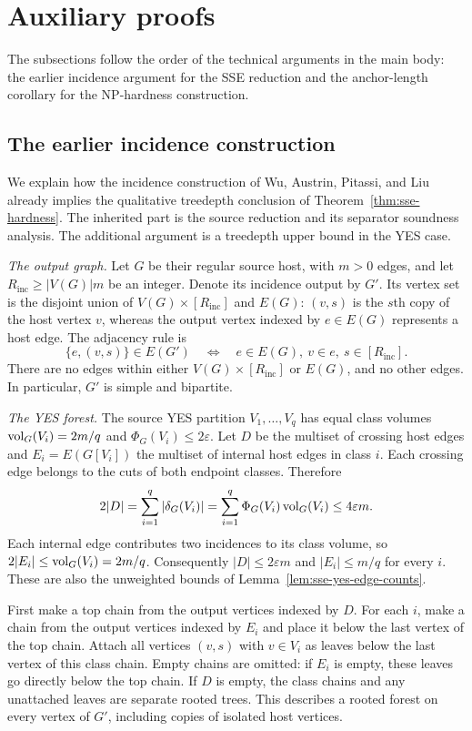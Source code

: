 ﻿\section{Auxiliary proofs}
\label{sec:auxiliary-proofs}

The subsections follow the order of the technical arguments in the
main body: the earlier incidence argument for the \textup{SSE} reduction
and the anchor-length corollary for the \textup{NP}-hardness construction.

\subsection{The earlier incidence construction}
\label{app:incidence-proof}

We explain how the incidence construction of Wu, Austrin, Pitassi, and
Liu~\cite[Sections~4.3 and~5]{APW} already implies the qualitative
treedepth conclusion of Theorem~\ref{thm:sse-hardness}. The inherited
part is the source reduction and its separator soundness analysis.
The additional argument is a treedepth upper bound in the YES case.

\emph{The output graph.}
Let $G$ be their regular source host, with $m>0$ edges, and let
$R_{\mathrm{inc}}\geq |V(G)|m$ be an integer. Denote its incidence output by
$G'$. Its vertex set is the disjoint union of $V(G)\times[R_{\mathrm{inc}}]$ and
$E(G)$: $(v,s)$ is the $s$th copy of the host vertex $v$, whereas
the output vertex indexed by $e\in E(G)$ represents a host edge.
The adjacency rule is
\[
 \{e,(v,s)\}\in E(G')
 \quad\Longleftrightarrow\quad
 e\in E(G),\ v\in e,\ s\in[R_{\mathrm{inc}}].
\]
There are no edges within either $V(G)\times[R_{\mathrm{inc}}]$ or $E(G)$, and
no other edges. In particular, $G'$ is simple and bipartite.

\emph{The YES forest.}
The source YES partition $V_1,\ldots,V_q$ has equal class volumes
$\operatorname{vol}_G(V_i)=2m/q$ and $\Phi_G(V_i)\leq2\varepsilon$.
Let $D$ be the multiset of crossing host edges and
$E_i=E(G[V_i])$ the multiset of internal host edges in class $i$.
Each crossing edge belongs to the cuts of both endpoint classes. Therefore
\[
 2|D|=\sum_{i=1}^q|\delta_G(V_i)|
 =\sum_{i=1}^q\Phi_G(V_i)\operatorname{vol}_G(V_i)
 \leq4\varepsilon m.
\]
Each internal edge contributes two incidences to its class volume,
so $2|E_i|\leq\operatorname{vol}_G(V_i)=2m/q$. Consequently
$|D|\leq2\varepsilon m$ and $|E_i|\leq m/q$ for every $i$.
These are also the unweighted bounds of
Lemma~\ref{lem:sse-yes-edge-counts}.

First make a top chain from the output vertices indexed by $D$.
For each $i$, make a chain from the output vertices indexed by
$E_i$ and place it below the last vertex of the top chain. Attach
all vertices $(v,s)$ with $v\in V_i$ as leaves below the last
vertex of this class chain. Empty chains are omitted: if $E_i$ is
empty, these leaves go directly below the top chain. If $D$ is
empty, the class chains and any unattached leaves are separate
rooted trees. This describes a rooted forest on every vertex of
$G'$, including copies of isolated host vertices.

